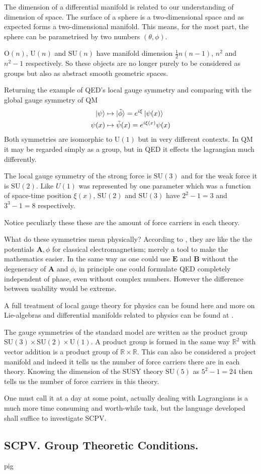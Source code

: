 \documentclass[twocolumn,floatfix,aps,prd,amsmath,amssymb]{revtex4}
\begin{document}
The dimension of a differential manifold is related to our understanding of dimension of space. The surface of a sphere is a two-dimensional space and as expected forms a two-dimensional manifold. This means, for the most part, the sphere can be parametrised by two numbers $(\theta,\phi)$.

$\mathrm{O}(n)$, $\mathrm{U}(n)$ and $\mathrm{SU}(n)$ have manifold dimension $\frac{1}{2}n(n-1)$, $n^2$ and $n^2-1$ respectively. So these objects are no longer purely to be considered as groups but also as abstract smooth geometric spaces.

Returning the example of QED's local gauge symmetry and comparing with the global gauge symmetry of QM
\begin{align*}
\ket{\psi} &\mapsto  \ket{\tilde{\phi}}=e^{i \xi} \ket{\psi(x)} \\
\psi(x) &\mapsto  \tilde{\psi}(x)=e^{i \xi(x)} \psi(x)
\end{align*}
Both symmetries are isomorphic to $\mathrm{U}(1)$ but in very different contexts. In QM it may be regarded simply as a group, but in QED it effects the lagrangian much differently.

The local gauge symmetry of the strong force is $\mathrm{SU}(3)$ and for the weak force it is $\mathrm{SU}(2)$. Like $U(1)$ was represented by one parameter which was a function of space-time position $\xi(x)$, $\mathrm{SU}(2)$ and $\mathrm{SU}(3)$ have $2^2-1=3$ and $3^3-1=8$ respectively.

Notice peculiarly these these are the amount of force carriers in each theory.

What do these symmetries mean physically? According to \cite{SCPV6}, they are like the the potentials $\mathbf{A}, \phi$ for classical electromagnetism; merely a tool to make the mathematics easier. In the same way as one could use $\mathbf{E}$ and $\mathbf{B}$ without the degeneracy of $\mathbf{A}$ and $\phi$, in principle one could formulate QED completely independent of phase, even without complex numbers.
However the difference between usability would be extreme.


A full treatment of local gauge theory for physics can be found here \cite{SCPV6} and more on Lie-algebras and differential manifolds related to physics can be found at \cite{SCPV3}. 

The gauge symmetries of the standard model are written as the product group $\mathrm{SU}(3)\times \mathrm{SU}(2)\times \mathrm{U}(1)$. A product group is formed in the same way $\mathbb{R}^2$ with vector addition is a product group of $\mathbb{R}\times\mathbb{R}$. This can also be considered a project manifold and indeed it tells us the number of force carriers there are in each theory. Knowing the dimension of the SUSY theory $\mathrm{SU}(5)$ as $5^2-1 = 24$ then tells us the number of force carriers in this theory.

One must call it at a day at some point, actually dealing with Lagrangians is a much more time consuming and worth-while task, but the language developed shall suffice to investigate SCPV.

\subsection{SCPV. Group Theoretic Conditions.}

\newpage
pig
\end{document}
